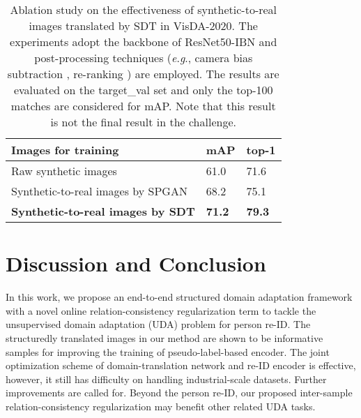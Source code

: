 \documentclass[journal]{IEEEtran}
\newcommand{\eg}{\textit{e}.\textit{g}., }
\begin{document}
\begin{table}[tbh]
\footnotesize
	\caption{Ablation study on the effectiveness of synthetic-to-real images translated by SDT in VisDA-2020. The experiments adopt the backbone of ResNet50-IBN \cite{pan2018two} and post-processing techniques (\eg camera bias subtraction \cite{zhu2020voc}, re-ranking \cite{zhong2017re}) are employed. The results are evaluated on the target\_val set and only the top-100 matches are considered for mAP. Note that this result is not the final result in the challenge.}
	\label{tab:sda}
	\begin{center}
	\begin{tabular}{P{5cm}|C{1cm}C{1cm}}
	\hline
	Images for training & mAP & top-1 \\
	\hline \hline
	Raw synthetic images & 61.0 & 71.6 \\
	Synthetic-to-real images by SPGAN \cite{deng2018image} & 68.2 & 75.1 \\
	\textbf{Synthetic-to-real images by SDT} & \textbf{71.2} &	\textbf{79.3} \\
	\hline
	\end{tabular}
	\end{center}
\end{table}



\section{Discussion and Conclusion}

In this work, we propose an end-to-end structured domain adaptation framework with a novel online relation-consistency regularization term to tackle the unsupervised domain adaptation (UDA) problem for person re-ID. The structuredly translated images in our method are shown to be informative samples for improving the training of pseudo-label-based encoder. The joint optimization scheme of domain-translation network and re-ID encoder is effective, however, it still has difficulty on handling industrial-scale datasets. Further improvements are called for. Beyond the person re-ID, our proposed inter-sample relation-consistency regularization may benefit other related UDA tasks.
\end{document}
